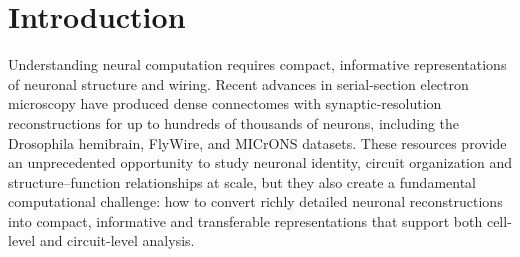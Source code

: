 \documentclass{article}
\begin{document}
\begin{abstract}
\end{abstract}

\section{Introduction}
Understanding neural computation requires compact, informative representations of neuronal structure and wiring. Recent advances in serial-section electron microscopy have produced dense connectomes with synaptic-resolution reconstructions for up to hundreds of thousands of neurons, including the Drosophila hemibrain, FlyWire, and MICrONS datasets. These resources provide an unprecedented opportunity to study neuronal identity, circuit organization and structure–function relationships at scale, but they also create a fundamental computational challenge: how to convert richly detailed neuronal reconstructions into compact, informative and transferable representations that support both cell-level and circuit-level analysis.
\end{document}
